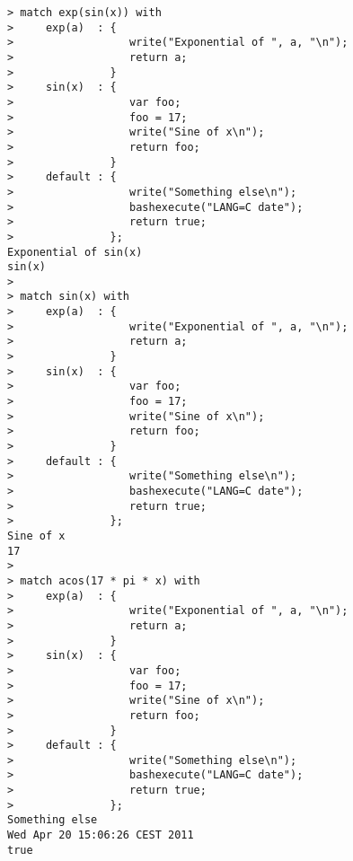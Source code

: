 \begin{center}\begin{minipage}{15cm}\begin{Verbatim}[frame=single]
> match exp(sin(x)) with
>     exp(a)  : { 
>                  write("Exponential of ", a, "\n");
>                  return a;
>               }
>     sin(x)  : {
>                  var foo;
>                  foo = 17;
>                  write("Sine of x\n");
>                  return foo;
>               }
>     default : {
>                  write("Something else\n");
>                  bashexecute("LANG=C date");
>                  return true;
>               };
Exponential of sin(x)
sin(x)
> 
> match sin(x) with
>     exp(a)  : { 
>                  write("Exponential of ", a, "\n");
>                  return a;
>               }
>     sin(x)  : {
>                  var foo;
>                  foo = 17;
>                  write("Sine of x\n");
>                  return foo;
>               }
>     default : {
>                  write("Something else\n");
>                  bashexecute("LANG=C date");
>                  return true;
>               };
Sine of x
17
> 
> match acos(17 * pi * x) with
>     exp(a)  : { 
>                  write("Exponential of ", a, "\n");
>                  return a;
>               }
>     sin(x)  : {
>                  var foo;
>                  foo = 17;
>                  write("Sine of x\n");
>                  return foo;
>               }
>     default : {
>                  write("Something else\n");
>                  bashexecute("LANG=C date");
>                  return true;
>               };
Something else
Wed Apr 20 15:06:26 CEST 2011
true
\end{Verbatim}
\end{minipage}\end{center}
